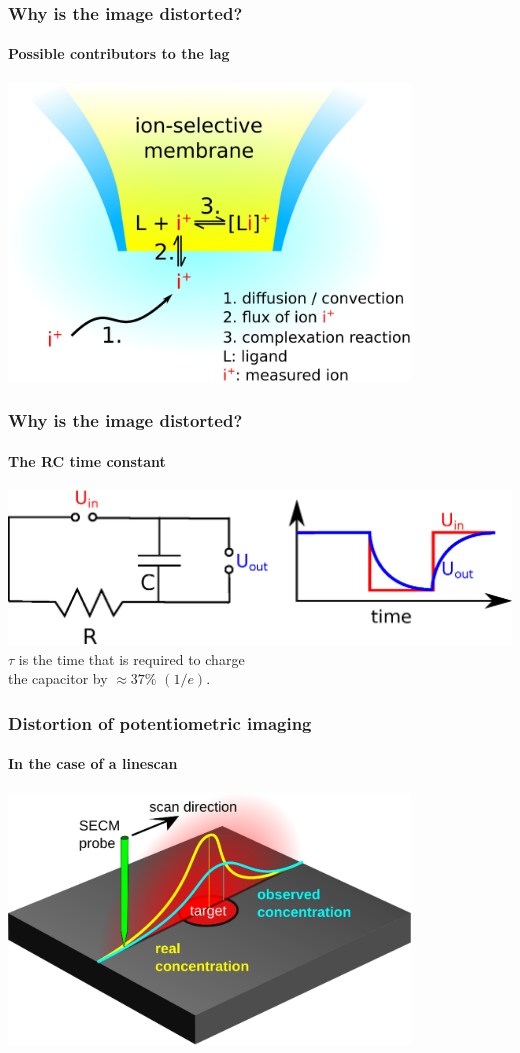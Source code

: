 \documentclass{beamer}
\begin{document}
\begin{frame}
\frametitle{Why is the image distorted?}
\framesubtitle{Possible contributors to the lag}
\centering
\includegraphics[width=0.8\textwidth]{npp.eps}
\end{frame}

\begin{frame}
	\frametitle{Why is the image distorted?}
	\framesubtitle{The RC time constant} 
	\centering
	\includegraphics[width=1\textwidth]{RC.eps}
	\vfill
	$\tau$ is the time that is required to charge \\ the capacitor by $\approx 37\%$ $(1/e)$.	
%	
%	
%	

\end{frame}

\begin{frame}
	\frametitle{Distortion of potentiometric imaging} 
	\framesubtitle{In the case of a linescan} 
	\centering
	\includegraphics[width=0.8\textwidth]{distortion2.eps}
\end{frame}
\end{document}

